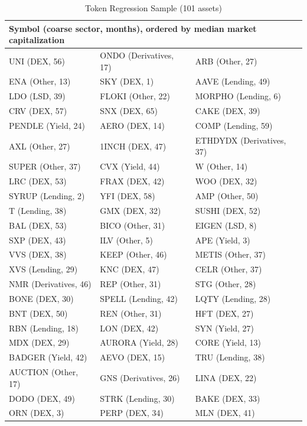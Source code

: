 \documentclass[12pt]{article}
\begin{document}
\begin{table}[p]
\centering
\caption{Token Regression Sample (101 assets)}
\label{tab:tokens_list}
\footnotesize
\setlength{\tabcolsep}{3pt}
\begin{tabular}{lll}
\toprule
\multicolumn{3}{l}{Symbol (coarse sector, months), ordered by median market capitalization} \\
\midrule
UNI (DEX, 56) & ONDO (Derivatives, 17) & ARB (Other, 27) \\
ENA (Other, 13) & SKY (DEX, 1) & AAVE (Lending, 49) \\
LDO (LSD, 39) & FLOKI (Other, 22) & MORPHO (Lending, 6) \\
CRV (DEX, 57) & SNX (DEX, 65) & CAKE (DEX, 39) \\
PENDLE (Yield, 24) & AERO (DEX, 14) & COMP (Lending, 59) \\
AXL (Other, 27) & 1INCH (DEX, 47) & ETHDYDX (Derivatives, 37) \\
SUPER (Other, 37) & CVX (Yield, 44) & W (Other, 14) \\
LRC (DEX, 53) & FRAX (DEX, 42) & WOO (DEX, 32) \\
SYRUP (Lending, 2) & YFI (DEX, 58) & AMP (Other, 50) \\
T (Lending, 38) & GMX (DEX, 32) & SUSHI (DEX, 52) \\
BAL (DEX, 53) & BICO (Other, 31) & EIGEN (LSD, 8) \\
SXP (DEX, 43) & ILV (Other, 5) & APE (Yield, 3) \\
VVS (DEX, 38) & KEEP (Other, 46) & METIS (Other, 37) \\
XVS (Lending, 29) & KNC (DEX, 47) & CELR (Other, 37) \\
NMR (Derivatives, 46) & REP (Other, 31) & STG (Other, 28) \\
BONE (DEX, 30) & SPELL (Lending, 42) & LQTY (Lending, 28) \\
BNT (DEX, 50) & REN (Other, 31) & HFT (DEX, 27) \\
RBN (Lending, 18) & LON (DEX, 42) & SYN (Yield, 27) \\
MDX (DEX, 29) & AURORA (Yield, 28) & CORE (Yield, 13) \\
BADGER (Yield, 42) & AEVO (DEX, 15) & TRU (Lending, 38) \\
AUCTION (Other, 17) & GNS (Derivatives, 26) & LINA (DEX, 22) \\
DODO (DEX, 49) & STRK (Lending, 30) & BAKE (DEX, 33) \\
ORN (DEX, 3) & PERP (DEX, 34) & MLN (DEX, 41) \\

\end{tabular}
\end{table}
\end{document}
